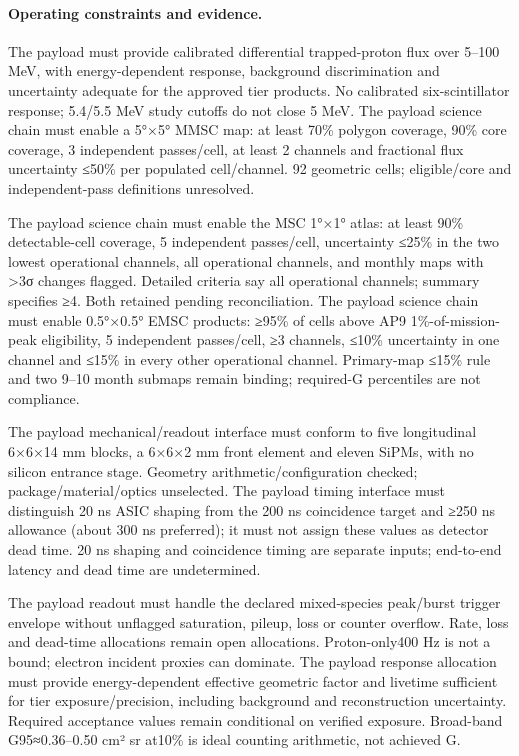 \paragraph{Operating constraints and evidence.} 
The payload must provide calibrated differential trapped-proton flux over 5–100 MeV, with energy-dependent response, background discrimination and uncertainty adequate for the approved tier products. No calibrated six-scintillator response; 5.4/5.5 MeV study cutoffs do not close 5 MeV.
The payload science chain must enable a 5°×5° MMSC map: at least 70\% polygon coverage, 90\% core coverage, 3 independent passes/cell, at least 2 channels and fractional flux uncertainty ≤50\% per populated cell/channel. 92 geometric cells; eligible/core and independent-pass definitions unresolved.

The payload science chain must enable the MSC 1°×1° atlas: at least 90\% detectable-cell coverage, 5 independent passes/cell, uncertainty ≤25\% in the two lowest operational channels, all operational channels, and monthly maps with >3σ changes flagged. Detailed criteria say all operational channels; summary specifies ≥4. Both retained pending reconciliation.
The payload science chain must enable 0.5°×0.5° EMSC products: ≥95\% of cells above AP9 1\%-of-mission-peak eligibility, 5 independent passes/cell, ≥3 channels, ≤10\% uncertainty in one channel and ≤15\% in every other operational channel. Primary-map ≤15\% rule and two 9–10 month submaps remain binding; required-G percentiles are not compliance.

The payload mechanical/readout interface must conform to five longitudinal 6×6×14 mm blocks, a 6×6×2 mm front element and eleven SiPMs, with no silicon entrance stage. Geometry arithmetic/configuration checked; package/material/optics unselected.
The payload timing interface must distinguish 20 ns ASIC shaping from the 200 ns coincidence target and ≥250 ns allowance (about 300 ns preferred); it must not assign these values as detector dead time. 20 ns shaping and coincidence timing are separate inputs; end-to-end latency and dead time are undetermined.

The payload readout must handle the declared mixed-species peak/burst trigger envelope without unflagged saturation, pileup, loss or counter overflow. Rate, loss and dead-time allocations remain open allocations. Proton-only400 Hz is not a bound; electron incident proxies can dominate.
The payload response allocation must provide energy-dependent effective geometric factor and livetime sufficient for tier exposure/precision, including background and reconstruction uncertainty. Required acceptance values remain conditional on verified exposure. Broad-band G95≈0.36–0.50 cm² sr at10\% is ideal counting arithmetic, not achieved G.

